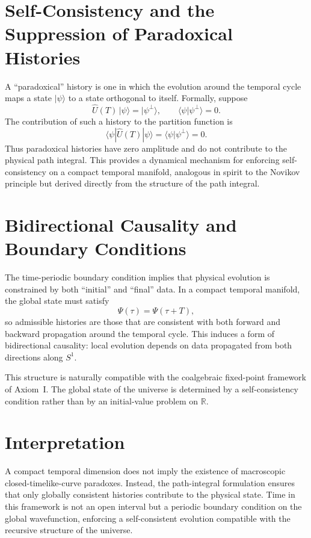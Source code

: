 \documentclass[12pt,openany]{book}
\theoremstyle{plain}
\theoremstyle{definition}
\theoremstyle{remark}
\begin{document}
\section{Self-Consistency and the Suppression of Paradoxical Histories}
A ``paradoxical'' history is one in which the evolution around the temporal
cycle maps a state $|\psi\rangle$ to a state orthogonal to itself. Formally,
suppose
\[
\hat{U}(T)\,|\psi\rangle = |\psi^{\perp}\rangle,
\qquad
\langle\psi|\psi^{\perp}\rangle = 0.
\]
The contribution of such a history to the partition function is
\[
\langle\psi|\hat{U}(T)|\psi\rangle
  = \langle\psi|\psi^{\perp}\rangle
  = 0.
\]
Thus paradoxical histories have zero amplitude and do not contribute to the
physical path integral. This provides a dynamical mechanism for enforcing
self-consistency on a compact temporal manifold, analogous in spirit to the
Novikov principle but derived directly from the structure of the path integral.

\section{Bidirectional Causality and Boundary Conditions}
The time-periodic boundary condition implies that physical evolution is
constrained by both ``initial'' and ``final'' data. In a compact temporal
manifold, the global state must satisfy
\[
\Psi(\tau) = \Psi(\tau + T),
\]
so admissible histories are those that are consistent with both forward and
backward propagation around the temporal cycle. This induces a form of
bidirectional causality: local evolution depends on data propagated from both
directions along $S^{1}$.

This structure is naturally compatible with the coalgebraic fixed-point
framework of Axiom~I. The global state of the universe is determined by a
self-consistency condition rather than by an initial-value problem on
$\mathbb{R}$.

\section{Interpretation}
A compact temporal dimension does not imply the existence of macroscopic
closed-timelike-curve paradoxes. Instead, the path-integral formulation ensures
that only globally consistent histories contribute to the physical state. Time
in this framework is not an open interval but a periodic boundary condition on
the global wavefunction, enforcing a self-consistent evolution compatible with
the recursive structure of the universe.
\end{document}
